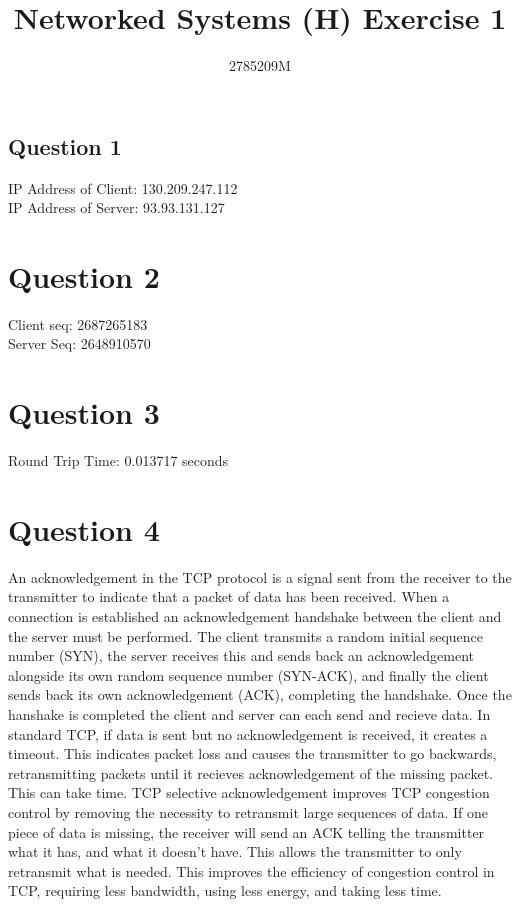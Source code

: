 \documentclass[11pt,a4paper,twocolumn]{article}
\begin{document}
\title{Networked Systems (H) Exercise 1}
\author{2785209M}
\maketitle

\subsection*{Question 1}
\begin{flushleft}
IP Address of Client: 130.209.247.112 \\
IP Address of Server: 93.93.131.127
\end{flushleft}

\section*{Question 2}
\begin{flushleft}
Client seq: 2687265183 \\
Server Seq: 2648910570
\end{flushleft}

\section*{Question 3}
\begin{flushleft}
Round Trip Time: 0.013717 seconds
\end{flushleft}

\section*{Question 4}
\begin{flushleft}
An acknowledgement in the TCP protocol is a signal sent from the receiver to the transmitter to indicate that a packet of data has been received.
When a connection is established an acknowledgement handshake between the client and the server must be performed. The client transmits a random initial sequence number (SYN),
the server receives this and sends back an acknowledgement alongside its own random sequence number (SYN-ACK), and finally the client sends back its own acknowledgement (ACK), completing the handshake.
Once the hanshake is completed the client and server can each send and recieve data. In standard TCP, if data is sent but no acknowledgement is received, it creates a timeout.
This indicates packet loss and causes the transmitter to go backwards, retransmitting packets until it recieves acknowledgement of the missing packet. This can take time. TCP selective acknowledgement improves TCP congestion control by removing
the necessity to retransmit large sequences of data. If one piece of data is missing, the receiver will send an ACK telling the transmitter what it has, and what it doesn't have. This allows the transmitter to only retransmit what is needed.
This improves the efficiency of congestion control in TCP, requiring less bandwidth, using less energy, and taking less time.
\end{flushleft}
\end{document}
